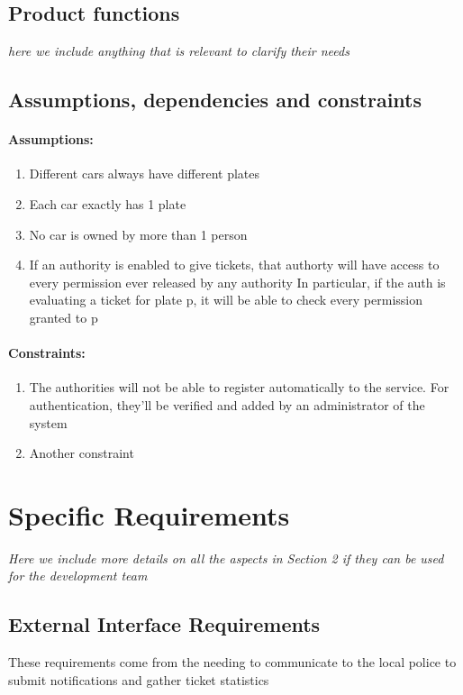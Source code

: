 \documentclass{article}
\newcommand{\enum}[1]{\texttt{#1.\arabic*}}
\begin{document}
	\subsection{Product functions}\textit{here we include anything that is relevant to clarify their needs}
	
	\subsection{Assumptions, dependencies and constraints}
	
	\paragraph{Assumptions:}
	\begin{enumerate}[label=\enum{A}]
		\item \label{A_disjPlates} Different cars always have different plates
		\item \label{A_Single plate}Each car exactly has 1 plate
		\item \label{A_singleOwner}No car is owned by more than 1 person
		\item \label{A_accessiblePermissions}If an authority is enabled to give tickets, that authorty will have access to every permission ever released by any authority
			\subitem In particular, if the auth is evaluating a ticket for plate p, it will be able to check every permission granted to p
	\end{enumerate}
	
	\paragraph{Constraints:}
	\begin{enumerate}[label=\enum{C}]
		\item The authorities will not be able to register automatically to the service. For authentication, they'll be verified and added by an administrator of the system
		\item Another constraint
	\end{enumerate}
	
\section{Specific Requirements} \textit{Here we include more details on all the aspects in Section 2 if they can be used for the development team}

	\subsection{External Interface Requirements}
		These requirements come from the needing to communicate to the local police to submit notifications and gather ticket statistics
		
\end{document}

